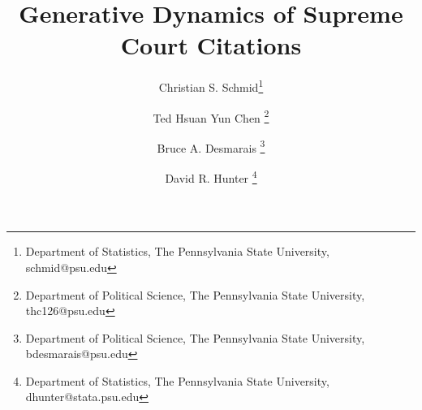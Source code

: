 \documentclass[headsepline=true, abstracton]{scrartcl}
\begin{document}
\renewcommand{\refname}{Bibliography}


\onehalfspacing
\setlength{\headsep}{15mm}


\thispagestyle{plain}

\title{\Large Generative Dynamics of Supreme Court Citations}

\author{%
  Christian S. Schmid\footnote{Department of Statistics, The Pennsylvania State University, schmid@psu.edu}%
  \and Ted Hsuan Yun Chen \footnote{Department of Political Science, The Pennsylvania State University, thc126@psu.edu}%
  \and Bruce A. Desmarais \footnote{Department of Political Science, The Pennsylvania State University, bdesmarais@psu.edu}%
  \and David R. Hunter \footnote{Department of Statistics, The Pennsylvania State University, dhunter@stata.psu.edu}%
  }
\end{document}
